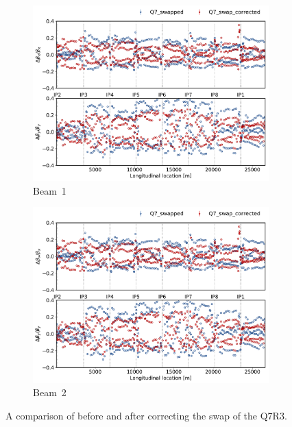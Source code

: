 \documentclass{cernatsnote}
\begin{document}
\begin{figure}[ht]
\begin{subfigure}{.5\textwidth}
  \centering
  \includegraphics[width=.99\linewidth]{inj_linear/beamtest/beam1/beta_beat_before_after_swap.pdf}  
  \caption{Beam~1}
\end{subfigure}
\begin{subfigure}{.5\textwidth}
  \centering
  \includegraphics[width=.99\linewidth]{inj_linear/beamtest/beam1/beta_beat_before_after_swap.pdf}  
  \caption{Beam~2}
\end{subfigure}
\caption{A comparison of before and after correcting the swap of the Q7R3.}
\label{fig:before_after_swap}
\end{figure}
\end{document}

